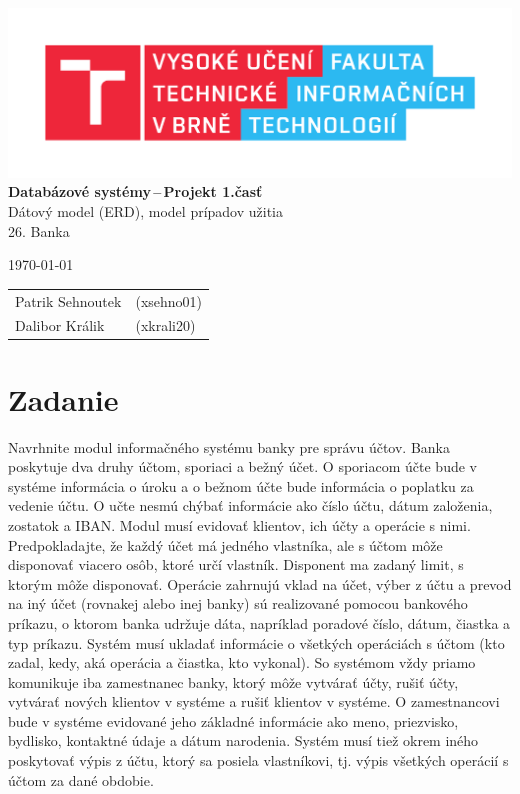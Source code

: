 \documentclass[a4paper, 11pt, report]{article}
\begin{document}
    \begin{titlepage}
        \begin{center}
            \includegraphics[width=0.77 \linewidth]{FIT_logo.pdf} \\
            
            {\Huge \textbf{Databázové systémy\,--\,Projekt 1.časť} \\[0.3em]
            \huge Dátový model (ERD), model prípadov užitia} \\[0.4em]
            {\LARGE 26. Banka}\\
        \end{center}
        
        {\Large \today \hfill 
            \begin{tabular}{l l}
    				Patrik Sehnoutek & (xsehno01) \\
    				Dalibor Králik & (xkrali20) \\
    			\end{tabular}
		}
    \end{titlepage}
    
    
    \section{Zadanie}

    Navrhnite modul informačného systému banky pre správu účtov. Banka poskytuje dva druhy účtom, sporiaci a bežný účet. O sporiacom účte bude v systéme informácia o úroku a o bežnom účte bude informácia o poplatku za vedenie účtu. O učte nesmú chýbať informácie ako číslo účtu, dátum založenia, zostatok a IBAN. Modul musí evidovať klientov, ich účty a operácie s nimi. Predpokladajte, že každý účet má jedného vlastníka, ale s účtom môže disponovať viacero osôb, ktoré určí vlastník. Disponent ma zadaný limit, s ktorým môže disponovať. Operácie zahrnujú vklad na účet, výber z účtu a prevod na iný účet (rovnakej alebo inej banky) sú realizované pomocou bankového príkazu, o ktorom banka udržuje dáta, napríklad poradové číslo, dátum, čiastka a typ príkazu. Systém musí ukladať informácie o všetkých operáciách s účtom (kto zadal, kedy, aká operácia a čiastka, kto vykonal). So systémom vždy priamo komunikuje iba zamestnanec banky, ktorý môže vytvárať účty, rušiť účty, vytvárať nových klientov v systéme a rušiť klientov v systéme. O zamestnancovi bude v systéme evidované jeho základné informácie ako meno, priezvisko, bydlisko, kontaktné údaje a dátum narodenia. Systém musí tiež okrem iného poskytovať výpis z účtu, ktorý sa posiela vlastníkovi, tj. výpis všetkých operácií s účtom za dané obdobie.
    
\end{document}
